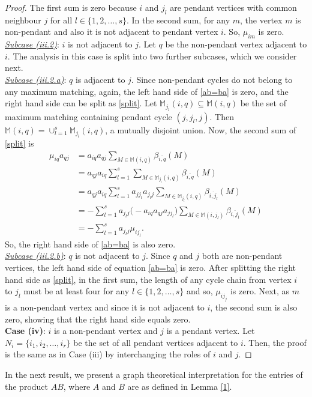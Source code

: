 \documentclass[notitlepage,12pt,reqno]{amsart}
\numberwithin{equation}{section}
\begin{document}
\begin{proof}
The first sum is zero because $i$ and $j_l$ are pendant vertices with common neighbour $j$ for all $l\in \{1,2,\ldots ,s\}$. In the second sum, for any $m$, the vertex $m$ is non-pendant and also it is not adjacent to pendant vertex $i$. So, $\mu _{im}$ is zero.\\
\underline{{\it Subcase \rm{(iii.2)}}}: $i$ is not adjacent to $j$. Let $q$ be the non-pendant vertex adjacent to $i$. The analysis in this case is split into two further subcases, which we consider next. \\
\underline{{\it Subcase \rm{(iii.2.a)}}}: $q$ is adjacent to $j$. Since non-pendant cycles do not belong to any maximum matching, again, the left hand side of \ref{ab=ba} is zero, and the right hand side can be split as \ref{split}. Let $\mathbb{M}_{j_l}(i,q)\subseteq \mathbb{M}(i,q)$ be the set of maximum matching containing pendant cycle $(j,j_l,j)$. Then $\mathbb{M}(i,q)=\cup _{l=1}^s\mathbb{M}_{j_l}(i,q)$, a mutually disjoint union. Now, the second sum of \ref{split} is
\begin{align*}
\mu _{iq}a_{qj}& =a_{iq}a_{qj}\sum _{M\in \mathbb{M}(i,q)}\beta _{\overline{i,q}}(M) \\
 &= a_{qj}a_{iq}\sum _{l=1}^s\sum _{M\in \mathbb{M}_{j_l}(i,q)}\beta _{\overline{i,q}}(M) \\
 &= a_{qj}a_{iq}\sum _{l=1}^sa_{jj_l}a_{j_lj}\sum _{M\in \mathbb{M}_{j_l}(i,q)}\beta _{\overline{i,j_l}}(M) \\
 &= -\sum _{l=1}^sa_{j_lj}\big (-a_{iq}a_{qj}a_{jj_l}\big )\sum _{M\in \mathbb{M}(i,j_l)}\beta _{\overline{i,j_l}}(M) \\
 &= -\sum _{l=1}^sa_{j_lj}\mu _{ij_l}.
\end{align*} 
So, the right hand side of \ref{ab=ba} is also zero.\\
\underline{{\it Subcase \rm{(iii.2.b)}}}: $q$ is not adjacent to $j$. Since $q$ and $j$ both are non-pendant vertices, the left hand side of equation \ref{ab=ba} is zero. After splitting the right hand side as \ref{split}, in the first sum, the length of any cycle chain from vertex $i$ to $j_l$ must be at least four for any $l\in \{1,2,\ldots ,s\}$ and so, $\mu _{ij_j}$ is zero. Next, as $m$ is a non-pendant vertex and since it is not adjacent to $i$, the second sum is also zero, showing that the right hand side equals zero.\\
{\bf Case (iv)}: $i$ is a non-pendant vertex and $j$ is a pendant vertex. Let $N_i=\{i_1,i_2,\ldots ,i_r\}$ be the set of all pendant vertices adjacent to $i$. Then, the proof is the same as in Case (iii) by interchanging the roles of $i$ and $j$.
\end{proof}
In the next result, we present a graph theoretical interpretation for the entries of the product $AB$, where $A$ and $B$ are as defined in Lemma \ref{1}.
\end{document}
